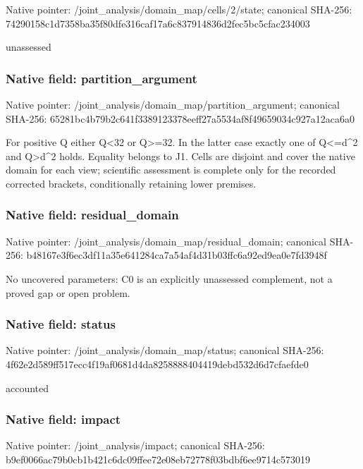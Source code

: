 \documentclass[10pt,a4paper]{article}
\begin{document}
Native pointer: /joint\_analysis/domain\_m\allowbreak{}ap/cells/2/state; canonical SHA-256: 74290158c1d7358ba35f80df\allowbreak{}e316caf17a6c837914836d2f\allowbreak{}ec5bc5cfac234003


unassessed


\subsubsection{Native field: partition\_argument}


Native pointer: /joint\_analysis/domain\_m\allowbreak{}ap/partition\_argument; canonical SHA-256: 65281bc4b79b2c641f338912\allowbreak{}3378eeff27a5534af8f49659\allowbreak{}034c927a12aca6a0


For positive Q either Q<32 or Q>=32. In the latter case exactly one of Q<=d\textasciicircum{}2 and Q>d\textasciicircum{}2 holds. Equality belongs to J1. Cells are disjoint and cover the native domain for each view; scientific assessment is complete only for the recorded corrected brackets, conditionally retaining lower premises.


\subsubsection{Native field: residual\_domain}


Native pointer: /joint\_analysis/domain\_m\allowbreak{}ap/residual\_domain; canonical SHA-256: b48167e3f6ec3df11a35e641\allowbreak{}284ca7a54af4d31b03ffc6a9\allowbreak{}2ed9ea0e7fd3948f


No uncovered parameters: C0 is an explicitly unassessed complement, not a proved gap or open problem.


\subsubsection{Native field: status}


Native pointer: /joint\_analysis/domain\_map/status; canonical SHA-256: 4f62e2d589ff517ecc4f19af\allowbreak{}0681d4da8258888404419deb\allowbreak{}d532d6d7cfaefde0


accounted


\subsubsection{Native field: impact}


Native pointer: /joint\_analysis/impact; canonical SHA-256: b9ef0066ac79b0cb1b421c6d\allowbreak{}c09ffee72e08eb72778f03bd\allowbreak{}bf6ee9714c573019
\end{document}
